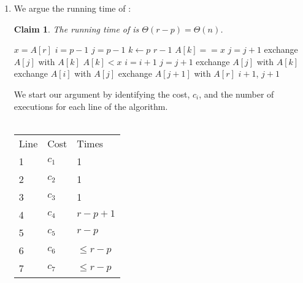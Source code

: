 \documentclass[11pt]{article}
\newtheorem{claim}[theorem]{Claim}
\theoremstyle{nonumberplain}
\newtheorem{proof}{Proof}
\begin{document}
\begin{enumerate}
\begin{proof}
\begin{enumerate}
\begin{enumerate}
        \end{enumerate} 
     \item \textsc{Termination}. At termination, $k=r$. Therefore, every element in $A[p..(r-1)]$ has been looked at and is a member of one of the three properties defined by the loop invariant. Moreover, each element has been partitioned into one of three groups: the left partition, $A[p..i]$, contains the elements with a value less than $x$, the middle partition, $A[(i+1)..j]$, contains the elements with a value equal to $x$, and the right partition, $A[(j+1)..(r-1)]$, contains the elements with a value greater than $x$.    
 \end{enumerate}
\end{proof}
 
\item We argue the running time of :
\begin{claim}
  The running time of  is $\Theta(r-p)=\Theta(n)$.
\end{claim}  
\begin{codebox}
\li $x=A[r]$
\li $i=p-1$
\li $j=p-1$
\li \For $k \gets p$ \To $r-1$ \Do
\li     \If $A[k]==x$ \Do
\li         $j=j+1$
\li         exchange $A[j]$ with $A[k]$
\li     \Else \If $A[k]<x$
\li         $i=i+1$
\li         $j=j+1$
\li         exchange $A[j]$ with $A[k]$
\li         exchange $A[i]$ with $A[j]$
        \End
    \End
\li exchange $A[j+1]$ with $A[r]$
\li \Return $i+1$, $j+1$
\end{codebox} 
We start our argument by identifying the cost, $c_i$, and the number of executions for each line of the  algorithm. \\
\\
  \begin{tabular}{ @{\hskip0pt}l l l }
  Line & Cost & Times \\
  1 & $c_1$ & 1 \\
  2 & $c_2$ & 1 \\
  3 & $c_3$ & 1 \\
  4 & $c_4$ & $r-p+1$ \\
  5 & $c_5$ & $r-p$ \\
  6 & $c_6$ & $\le r-p$ \\
  7 & $c_7$ & $\le r-p$ \\

\end{tabular}
\end{enumerate}
\end{document}
